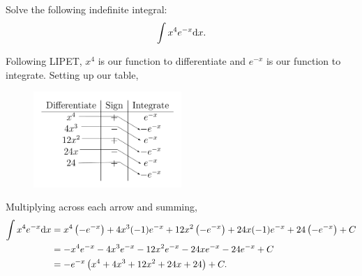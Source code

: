 \begin{example}
	Solve the following indefinite integral:
	\begin{equation*}
		\int{x^4e^{-x}\mathrm{d} x}.
	\end{equation*}
\end{example}
\begin{answer}
	Following LIPET, $x^4$ is our function to differentiate and $e^{-x}$ is our function to integrate.
	Setting up our table,
	\begin{figure}[H]
		\label{tabular}
		\centering
		\includegraphics[width = 0.5\textwidth]{./integrals/integration_by_parts/tabular.png}
	\end{figure}
	Multiplying across each arrow and summing,
	\begin{align*}
		\int{x^4e^{-x}\mathrm{d} x} &= x^4\left(-e^{-x}\right) + 4x^3(-1)e^{-x} + 12x^2\left(-e^{-x}\right) + 24x(-1)e^{-x} + 24\left(-e^{-x}\right) + C \\
		&= -x^4e^{-x} - 4x^3e^{-x} - 12x^2e^{-x} - 24xe^{-x} - 24e^{-x} + C \\
		&= -e^{-x}\left(x^4 + 4x^3 + 12x^2 + 24x + 24\right) + C.
	\end{align*}
\end{answer}